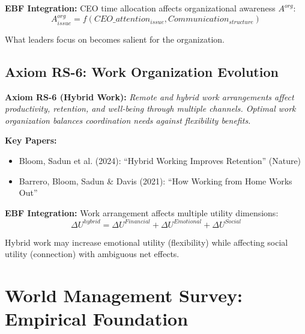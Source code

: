 \textbf{EBF Integration:}
CEO time allocation affects organizational awareness $A^{org}$:
\begin{equation}
A^{org}_{issue} = f(CEO\_attention_{issue}, Communication_{structure})
\end{equation}

What leaders focus on becomes salient for the organization.

\subsection{Axiom RS-6: Work Organization Evolution}

\begin{tcolorbox}[colback=blue!5!white, colframe=blue!75!black]
\textbf{Axiom RS-6 (Hybrid Work):}
\textit{Remote and hybrid work arrangements affect productivity, retention,
and well-being through multiple channels. Optimal work organization
balances coordination needs against flexibility benefits.}
\end{tcolorbox}

\textbf{Key Papers:}
\begin{itemize}[nosep]
    \item Bloom, Sadun et al. (2024): ``Hybrid Working Improves Retention'' (Nature)
    \item Barrero, Bloom, Sadun \& Davis (2021): ``How Working from Home Works Out''
\end{itemize}

\textbf{EBF Integration:}
Work arrangement affects multiple utility dimensions:
\begin{equation}
\Delta U^{hybrid} = \Delta U^{Financial} + \Delta U^{Emotional} + \Delta U^{Social}
\end{equation}

Hybrid work may increase emotional utility (flexibility) while affecting
social utility (connection) with ambiguous net effects.

\section{World Management Survey: Empirical Foundation}

